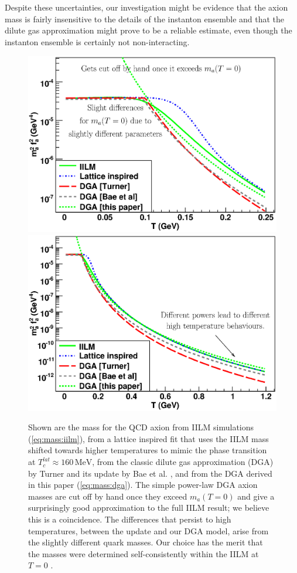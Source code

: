 \documentclass[preprint,nofootinbib]{revtex4}
\newcommand{\units}[1]{\, \mathrm{#1}}
\begin{document}
Despite these uncertainties, our investigation might be evidence that the axion mass is fairly insensitive to the details of the instanton ensemble and that the dilute gas approximation might prove to be a reliable estimate, even though the instanton ensemble is certainly not non-interacting.

\begin{figure}[tbp]
\begin{center}
 \includegraphics[width=0.95\figwidth,clip=true,trim=0mm 0mm 15mm 10mm]{masses1.eps}
 \includegraphics[width=0.95\figwidth,clip=true,trim=0mm 0mm 15mm 10mm]{masses2.eps}
\end{center}
\caption{Shown are the mass for the QCD axion from IILM simulations (\ref{eq:mass:iilm}), from a lattice inspired fit that uses the IILM mass shifted towards higher temperatures to mimic the phase transition at $T^{lat}_c\approx 160 \units{MeV}$, from the classic dilute gas approximation (DGA) by Turner \cite{turner:axion:cosmology} and its update by Bae et al. \cite{bae:huh:kim:axion}, and from the DGA derived in this paper (\ref{eq:mass:dga}). The simple power-law DGA axion masses are cut off by hand once they exceed $m_a(T=0)$ and give a surprisingly good approximation to the full IILM result; we believe this is a coincidence. The differences that persist to high temperatures, between the update and our DGA model, arise from the slightly different quark masses. Our choice has the merit that the masses were determined self-consistently within the IILM at $T=0$ \cite{wantz:iilm:1}.}\label{fig:masses}

\end{figure}
\end{document}
